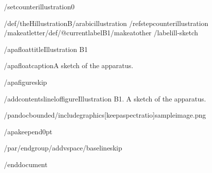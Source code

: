 /setcounter{illustration}{0}

/def/theHillustration{B/arabic{illustration}}%
/refstepcounter{illustration}%
/makeatletter/def/@currentlabel{B1}/makeatother%
/label{ill-sketch}

/apafloattitle{Illustration B1}

/apafloatcaption{A sketch of the apparatus.}

/apafigureskip

/addcontentsline{lof}{figure}{Illustration B1. A sketch of the
apparatus.}

/pandocbounded{/includegraphics[keepaspectratio]{sampleimage.png}}

/apakeepend{0pt}

/par/endgroup/addvspace{/baselineskip}




/end{document}
